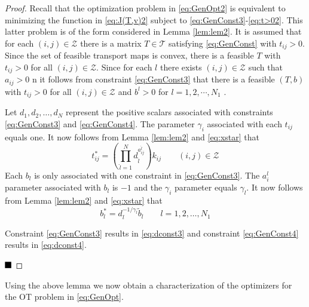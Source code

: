 \documentclass[twocolumn]{article}
\def\qed{ \rule{.1in}{.1in}}
\begin{document}
\begin{proof}  
Recall that the optimization problem in  \eqref{eq:GenOpt2}  is equivalent to minimizing the function in 
\eqref{eq:J(T,v)2} subject to  \eqref{eq:GenConst3}-\eqref{eq:t>02}. 
This latter problem is of the form considered in Lemma \ref{lem:lem2}. It is assumed that for each $(i,j) \in {\mathcal Z}$ there is a matrix $T\in {\mathcal T}$ satisfying \eqref{eq:GenConst}  with $t_{ij} >0$.
Since the set of feasible transport maps is convex,
there is a feasible $T$ with $t_{ij} >0$ for all $(i,j) \in {\mathcal Z}$.
Since for each $l$ there exists $(i,j) \in {\mathcal Z}$ such that $a_{ij} >0$ n
it follows from constraint \eqref{eq:GenConst3} that there is a feasible $(T,b)$
with $t_{ij} >0$ for all $(i,j) \in {\mathcal Z}$ and  $b^l >0$ for $l=1,2,\cdots, N_1$ .

Let $d_{1}, d_{2}, \dots, d_N$  represent the positive scalars associated with constraints
\eqref{eq:GenConst3}  and \eqref{eq:GenConst4}.
The parameter $\gamma_i$  associated with each $t_{ij}$ equals one. It now follows from Lemma \ref{lem:lem2} and 
\eqref{eq:xstar} that
\[
t^*_{ij} = \left(\prod_{{\hat l}=1}^Nd_{\hat l}^{a^{\hat l}_{ij}} \right)
k_{ij}\qquad (i,j) \in \mathcal{Z}
\]
Each $b_l$ is only associated with   one constraint in \eqref{eq:GenConst3}. 
The  $a^l_i$ parameter associated with $b_l$  is $-1$ and the $\gamma_i$ parameter equals 
$\gamma_{l}$.
It now follows from Lemma \ref{lem:lem2} and 
\eqref{eq:xstar} that
\[
b^*_l = d_{l}^{-1/\gamma_{l}} \tilde{b}_l
\qquad l=1,2,\dots, N_1
\]

Constraint \eqref{eq:GenConst3} results in \eqref{eq:dconst3}
and constraint \eqref{eq:GenConst4} results in \eqref{eq:dconst4}.

\hfill
$\qed$
\end{proof}

Using the above lemma we now obtain a characterization of the optimizers for the OT problem 
in \eqref{eq:GenOpt}.
\end{document}
